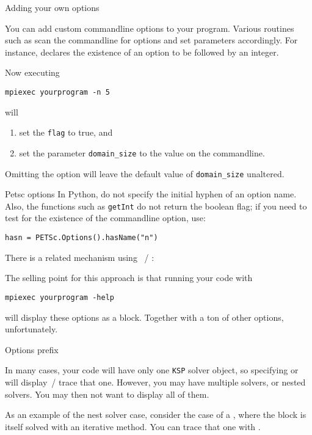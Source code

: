  {Adding your own options}

You can add custom 
commandline options to your program.
Various routines such as 
scan the commandline for options and set parameters accordingly.
For instance,
%
%
declares the existence of an option  to be followed by an integer.

Now executing
\begin{verbatim}
mpiexec yourprogram -n 5
\end{verbatim}
will
\begin{enumerate}
\item set the \lstinline{flag} to true, and
\item set the parameter \lstinline{domain_size} to the value on the commandline.
\end{enumerate}
Omitting the  option will leave the default value of \lstinline{domain_size}
unaltered.

\begin{pythonnote}{Petsc options}
  In Python, do not specify the initial hyphen of an option name.
  Also, the functions such as \lstinline{getInt} do not return the boolean flag;
  if you need to test for the existence of the commandline option, use:
\begin{verbatim}
hasn = PETSc.Options().hasName("n")
\end{verbatim}
\end{pythonnote}

There is a related mechanism using
~/ :

The selling point for this approach is that running your code with
\begin{verbatim}
mpiexec yourprogram -help
\end{verbatim}
will display these options as a block.
Together with a ton of other options, unfortunately.

 {Options prefix}

In many cases, your code will have only one \lstinline{KSP} solver object,
so specifying  or 
will display~/ trace that one.
However, you may have multiple solvers, or nested solvers. You may then
not want to display all of them.

As an example of the nest solver case, consider the case of a
, where the block is itself solved
with an iterative method. You can trace that one with
.

